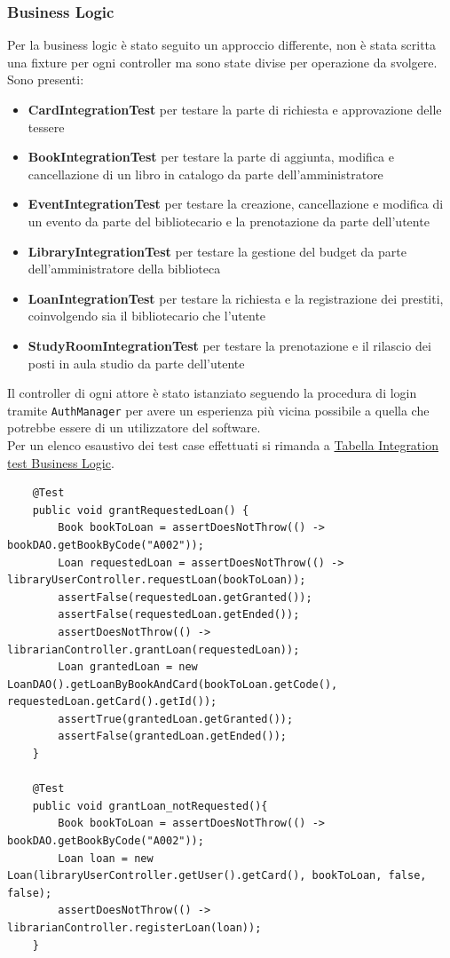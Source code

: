 \subsubsection{Business Logic}
Per la business logic è stato seguito un approccio differente, non è stata scritta una fixture per ogni controller ma sono state divise per operazione da svolgere. Sono presenti:
\begin{itemize}
    \item \textbf{CardIntegrationTest} per testare la parte di richiesta e approvazione delle tessere
    \item \textbf{BookIntegrationTest} per testare la parte di aggiunta, modifica e cancellazione di un libro in catalogo da parte dell'amministratore
    \item \textbf{EventIntegrationTest} per testare la creazione, cancellazione e modifica di un evento da parte del bibliotecario e la prenotazione da parte dell'utente
    \item \textbf{LibraryIntegrationTest} per testare la gestione del budget da parte dell'amministratore della biblioteca
    \item \textbf{LoanIntegrationTest} per testare la richiesta e la registrazione dei prestiti, coinvolgendo sia il bibliotecario che l'utente
    \item \textbf{StudyRoomIntegrationTest} per testare la prenotazione e il rilascio dei posti in aula studio da parte dell'utente
\end{itemize}
Il controller di ogni attore è stato istanziato seguendo la procedura di login tramite \texttt{AuthManager} per avere un esperienza più vicina possibile a quella che potrebbe essere di un utilizzatore del software.\\
Per un elenco esaustivo dei test case effettuati si rimanda a \hyperref[BL_IT]{Tabella Integration test Business Logic}.
\begin{code}
    \begin{verbatim}
    @Test
    public void grantRequestedLoan() {
        Book bookToLoan = assertDoesNotThrow(() -> bookDAO.getBookByCode("A002"));
        Loan requestedLoan = assertDoesNotThrow(() -> libraryUserController.requestLoan(bookToLoan));
        assertFalse(requestedLoan.getGranted());
        assertFalse(requestedLoan.getEnded());
        assertDoesNotThrow(() -> librarianController.grantLoan(requestedLoan));
        Loan grantedLoan = new LoanDAO().getLoanByBookAndCard(bookToLoan.getCode(), requestedLoan.getCard().getId());
        assertTrue(grantedLoan.getGranted());
        assertFalse(grantedLoan.getEnded());
    }

    @Test
    public void grantLoan_notRequested(){
        Book bookToLoan = assertDoesNotThrow(() -> bookDAO.getBookByCode("A002"));
        Loan loan = new Loan(libraryUserController.getUser().getCard(), bookToLoan, false, false);
        assertDoesNotThrow(() -> librarianController.registerLoan(loan));
    }
    \end{verbatim}
    \caption{Test case da LoanIntegrationTest}
\end{code}
